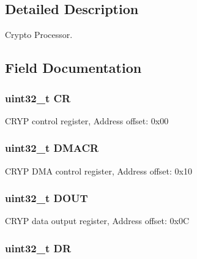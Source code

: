 \subsection{Detailed Description}
Crypto Processor. 

\subsection{Field Documentation}
\hypertarget{struct_c_r_y_p___type_def_ab40c89c59391aaa9d9a8ec011dd0907a}{
\subsubsection[{C\-R}]{ uint32\-\_\-t C\-R}}\label{struct_c_r_y_p___type_def_ab40c89c59391aaa9d9a8ec011dd0907a}
C\-R\-Y\-P control register, Address offset\-: 0x00 \hypertarget{struct_c_r_y_p___type_def_a082219a924d748e9c6092582aec06226}{
\subsubsection[{D\-M\-A\-C\-R}]{ uint32\-\_\-t D\-M\-A\-C\-R}}\label{struct_c_r_y_p___type_def_a082219a924d748e9c6092582aec06226}
C\-R\-Y\-P D\-M\-A control register, Address offset\-: 0x10 \hypertarget{struct_c_r_y_p___type_def_ab8ba768d1dac54a845084bd07f4ef2b9}{
\subsubsection[{D\-O\-U\-T}]{ uint32\-\_\-t D\-O\-U\-T}}\label{struct_c_r_y_p___type_def_ab8ba768d1dac54a845084bd07f4ef2b9}
C\-R\-Y\-P data output register, Address offset\-: 0x0\-C \hypertarget{struct_c_r_y_p___type_def_a3df0d8dfcd1ec958659ffe21eb64fa94}{
\subsubsection[{D\-R}]{ uint32\-\_\-t D\-R}}\label{struct_c_r_y_p___type_def_a3df0d8dfcd1ec958659ffe21eb64fa94}
